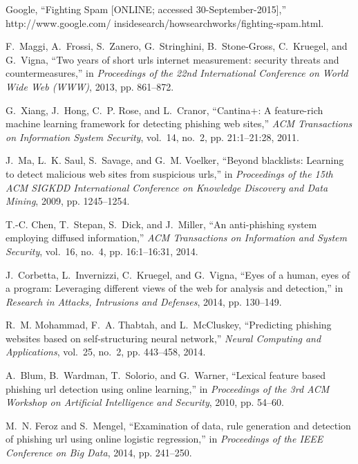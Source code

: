 \documentclass[10pt,conference,compsocconf,letterpaper]{IEEEtran}
\begin{document}
\begin{thebibliography}{10}
Google, ``{Fighting Spam [ONLINE; accessed 30-September-2015]},''
  http://www.google.com/ insidesearch/howsearchworks/fighting-spam.html.

F.~Maggi, A.~Frossi, S.~Zanero, G.~Stringhini, B.~Stone{-}Gross, C.~Kruegel,
  and G.~Vigna, ``Two years of short urls internet measurement: security
  threats and countermeasures,'' in \emph{Proceedings of the 22nd International
  Conference on World Wide Web (WWW)}, 2013, pp. 861--872.

G.~Xiang, J.~Hong, C.~P. Rose, and L.~Cranor, ``Cantina+: A feature-rich
  machine learning framework for detecting phishing web sites,'' \emph{ACM
  Transactions on Information System Security}, vol.~14, no.~2, pp.
  21:1--21:28, 2011.

J.~Ma, L.~K. Saul, S.~Savage, and G.~M. Voelker, ``Beyond blacklists: Learning
  to detect malicious web sites from suspicious urls,'' in \emph{Proceedings of
  the 15th ACM SIGKDD International Conference on Knowledge Discovery and Data
  Mining}, 2009, pp. 1245--1254.

T.-C. Chen, T.~Stepan, S.~Dick, and J.~Miller, ``An anti-phishing system
  employing diffused information,'' \emph{ACM Transactions on Information and
  System Security}, vol.~16, no.~4, pp. 16:1--16:31, 2014.

J.~Corbetta, L.~Invernizzi, C.~Kruegel, and G.~Vigna, ``Eyes of a human, eyes
  of a program: Leveraging different views of the web for analysis and
  detection,'' in \emph{Research in Attacks, Intrusions and Defenses}, 2014,
  pp. 130--149.

R.~M. Mohammad, F.~A. Thabtah, and L.~McCluskey, ``Predicting phishing websites
  based on self-structuring neural network,'' \emph{Neural Computing and
  Applications}, vol.~25, no.~2, pp. 443--458, 2014.

A.~Blum, B.~Wardman, T.~Solorio, and G.~Warner, ``Lexical feature based
  phishing url detection using online learning,'' in \emph{Proceedings of the
  3rd ACM Workshop on Artificial Intelligence and Security}, 2010, pp. 54--60.

M.~N. Feroz and S.~Mengel, ``Examination of data, rule generation and detection
  of phishing url using online logistic regression,'' in \emph{Proceedings of
  the IEEE Conference on Big Data}, 2014, pp. 241--250.


\end{thebibliography}
\end{document}
